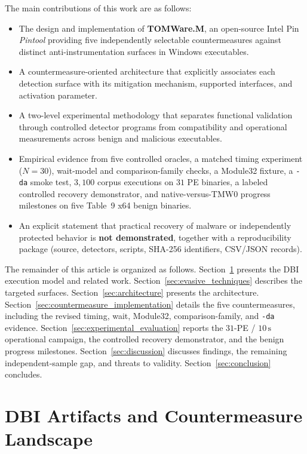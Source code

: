 \documentclass[pdflatex,sn-mathphys-num]{sn-jnl}
\theoremstyle{thmstyleone}
\theoremstyle{thmstyletwo}
\theoremstyle{thmstylethree}
\begin{document}
The main contributions of this work are as follows:

\begin{itemize}
    \item The design and implementation of \textbf{TOMWare.M}, an open-source Intel Pin \textit{Pintool} providing five independently selectable countermeasures against distinct anti-instrumentation surfaces in Windows executables.
    \item A countermeasure-oriented architecture that explicitly associates each detection surface with its mitigation mechanism, supported interfaces, and activation parameter.
    \item A two-level experimental methodology that separates functional validation through controlled detector programs from compatibility and operational measurements across benign and malicious executables.
    \item Empirical evidence from five controlled oracles, a matched timing experiment ($N=30$), wait-model and comparison-family checks, a Module32 fixture, a \texttt{-da} smoke test, $3{,}100$ corpus executions on $31$ PE binaries, a labeled controlled recovery demonstrator, and native-versus-TMW0 progress milestones on five Table~9 x64 benign binaries.
    \item An explicit statement that practical recovery of malware or independently protected behavior is \textbf{not demonstrated}, together with a reproducibility package (source, detectors, scripts, SHA-256 identifiers, CSV/JSON records).
\end{itemize}

The remainder of this article is organized as follows. Section~\ref{sec:background} presents the DBI execution model and related work. Section~\ref{sec:evasive_techniques} describes the targeted surfaces. Section~\ref{sec:architecture} presents the architecture. Section~\ref{sec:countermeasure_implementation} details the five countermeasures, including the revised timing, wait, Module32, comparison-family, and \texttt{-da} evidence. Section~\ref{sec:experimental_evaluation} reports the $31$-PE / $10\,\mathrm{s}$ operational campaign, the controlled recovery demonstrator, and the benign progress milestones. Section~\ref{sec:discussion} discusses findings, the remaining independent-sample gap, and threats to validity. Section~\ref{sec:conclusion} concludes.

\section{DBI Artifacts and Countermeasure Landscape}
\label{sec:background}
\end{document}
